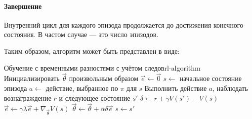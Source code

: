 \paragraph{Завершение}
Внутренний цикл для каждого эпизода продолжается до достижения конечного состояния. В частом случае --- это число эпизодов.

Таким образом, алгоритм может быть представлен в виде:

\begin{alg}{Обучение с временными разностями с учётом следов}{rl-algorithm}
    \State Инициализировать $\vec{\theta}$ произвольным образом
        \State $\vec{e} \gets \vec{0}$
        \State $s \gets$ начальное состояние эпизода
            \State $a \gets$ действие, выбранное по $\pi$ для $s$
            \State Выполнить действие $a$, наблюдать вознаграждение $r$ и следующее состояние $s'$
            \State $\delta \gets r + \gamma V(s') - V(s)$
            \State $\vec{e} \gets \gamma \lambda \vec{e} + \nabla_{\vec{\theta}} V(s)$
            \State $\vec{\theta} \gets \vec{\theta} + \alpha \delta \vec{e}$
            \State $s \gets s'$
        \EndWhile
    \EndWhile
\end{alg}
